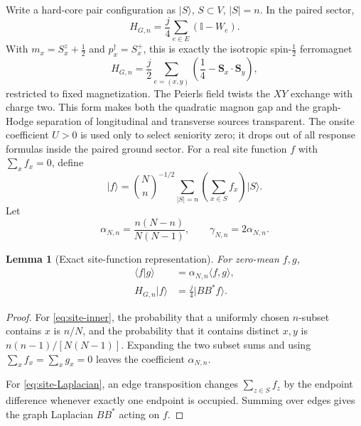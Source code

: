\documentclass[11pt]{article}
\newtheorem{lemma}[theorem]{Lemma}
\theoremstyle{definition}
\theoremstyle{remark}
\newcommand{\Id}{\mathbb I}
\newcommand{\ket}[1]{\lvert #1\rangle}
\newcommand{\abs}[1]{\lvert #1\rvert}
\newcommand{\ip}[2]{\langle #1,#2\rangle}
\newcommand{\braket}[1]{\langle #1\rangle}
\begin{document}
Write a hard-core pair configuration as $\ket S$, $S\subset V$, $\abs S=n$.  In the paired sector,
\begin{equation}
 H_{G,n}
 =\frac j4\sum_{e\in E}(\Id-W_e).
 \label{eq:exclusion-generator}
\end{equation}
With $m_x=S_x^z+\tfrac12$ and $p_x^\dagger=S_x^+$, this is exactly the isotropic spin-$\tfrac12$
ferromagnet
\begin{equation}
 H_{G,n}=\frac j2\sum_{e=(x,y)}\left(\frac14-\bm S_x\!\cdot\!\bm S_y\right),
 \label{eq:ferromagnet-form}
\end{equation}
restricted to fixed magnetization.  The Peierls field twists the $XY$ exchange with charge two.  This
form makes both the quadratic magnon gap and the graph-Hodge separation of longitudinal and transverse
sources transparent.  The onsite coefficient $U>0$ is used only to select seniority zero; it drops out of
all response formulas inside the paired ground sector.
For a real site function $f$ with $\sum_x f_x=0$, define
\begin{equation}
 \ket f
 =\binom Nn^{-1/2}
 \sum_{\abs S=n}\left(\sum_{x\in S}f_x\right)\ket S.
 \label{eq:site-function-state}
\end{equation}
Let
\begin{equation}
 \alpha_{N,n}=\frac{n(N-n)}{N(N-1)},
 \qquad
 \gamma_{N,n}=2\alpha_{N,n}.
 \label{eq:alpha-gamma}
\end{equation}

\begin{lemma}[Exact site-function representation]
\label{lem:site-functions}
For zero-mean $f,g$,
\begin{align}
 \braket{f|g}&=\alpha_{N,n}\ip{f}{g},
 \label{eq:site-inner}\\
 H_{G,n}\ket f&=\frac j4\ket{BB^*f}.
 \label{eq:site-Laplacian}
\end{align}
\end{lemma}

\begin{proof}
For \eqref{eq:site-inner}, the probability that a uniformly chosen $n$-subset contains $x$ is $n/N$,
and the probability that it contains distinct $x,y$ is $n(n-1)/[N(N-1)]$.  Expanding the two subset
sums and using $\sum_x f_x=\sum_xg_x=0$ leaves the coefficient $\alpha_{N,n}$.

For \eqref{eq:site-Laplacian}, an edge transposition changes
$\sum_{z\in S}f_z$ by the endpoint difference whenever exactly one endpoint is occupied.  Summing over
edges gives the graph Laplacian $BB^*$ acting on $f$.
\end{proof}
\end{document}
